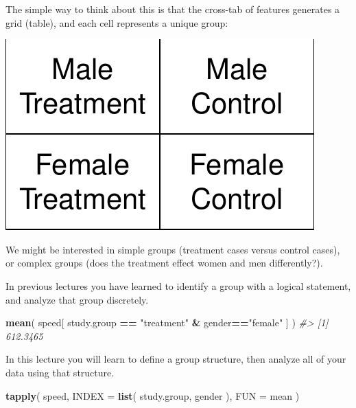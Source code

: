 \documentclass[]{book}
\newenvironment{Shaded}{\begin{snugshade}}{\end{snugshade}}
\newcommand{\CommentTok}[1]{\textcolor[rgb]{0.56,0.35,0.01}{\textit{#1}}}
\newcommand{\DataTypeTok}[1]{\textcolor[rgb]{0.13,0.29,0.53}{#1}}
\newcommand{\KeywordTok}[1]{\textcolor[rgb]{0.13,0.29,0.53}{\textbf{#1}}}
\newcommand{\NormalTok}[1]{#1}
\newcommand{\OperatorTok}[1]{\textcolor[rgb]{0.81,0.36,0.00}{\textbf{#1}}}
\newcommand{\StringTok}[1]{\textcolor[rgb]{0.31,0.60,0.02}{#1}}
\theoremstyle{definition}
\theoremstyle{definition}
\theoremstyle{definition}
\theoremstyle{remark}
\begin{document}
The simple way to think about this is that the cross-tab of features
generates a grid (table), and each cell represents a unique group:

\begin{center}\includegraphics[width=0.7\linewidth]{DS4PS-I_files/figure-latex/unnamed-chunk-128-1} \end{center}

We might be interested in simple groups (treatment cases versus control
cases), or complex groups (does the treatment effect women and men
differently?).

In previous lectures you have learned to identify a group with a logical
statement, and analyze that group discretely.

\begin{Shaded}
\begin{Highlighting}[]

\KeywordTok{mean}\NormalTok{( speed[ study.group }\OperatorTok{==}\StringTok{ "treatment"} \OperatorTok{&}\StringTok{ }\NormalTok{gender}\OperatorTok{==}\StringTok{"female"}\NormalTok{ ] )}
\CommentTok{#> [1] 612.3465}
\end{Highlighting}
\end{Shaded}

In this lecture you will learn to define a group structure, then analyze
all of your data using that structure.

\begin{Shaded}
\begin{Highlighting}[]

\KeywordTok{tapply}\NormalTok{( speed, }\DataTypeTok{INDEX =} \KeywordTok{list}\NormalTok{( study.group, gender ), }\DataTypeTok{FUN =}\NormalTok{ mean )}
\end{Highlighting}
\end{Shaded}
\end{document}
